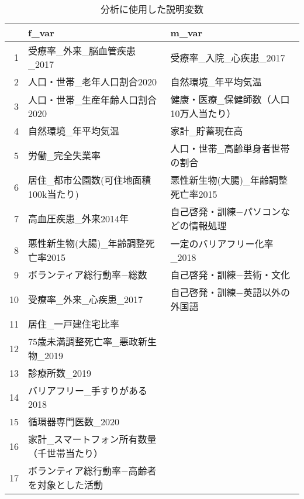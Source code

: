 \begin{table}[ht]
\centering
\begingroup\tiny
\begin{tabular}{rll}
  \hline
 & f\_var & m\_var \\
  \hline
1 & 受療率\_外来\_脳血管疾患\_2017 & 受療率\_入院\_心疾患\_2017 \\
  2 & 人口・世帯\_老年人口割合2020 & 自然環境\_年平均気温 \\
  3 & 人口・世帯\_生産年齢人口割合2020 & 健康・医療\_保健師数（人口10万人当たり） \\ 
  4 & 自然環境\_年平均気温 & 家計\_貯蓄現在高 \\
  5 & 労働\_完全失業率 & 人口・世帯\_高齢単身者世帯の割合 \\
  6 & 居住\_都市公園数(可住地面積100k当たり) & 悪性新生物(大腸)\_年齢調整死亡率2015 \\
  7 & 高血圧疾患\_外来2014年 & 自己啓発・訓練−パソコンなどの情報処理 \\
  8 & 悪性新生物(大腸)\_年齢調整死亡率2015 & 一定のバリアフリー化率\_2018 \\
  9 & ボランティア総行動率−総数 & 自己啓発・訓練−芸術・文化 \\
  10 & 受療率\_外来\_心疾患\_2017 & 自己啓発・訓練−英語以外の外国語 \\
  11 & 居住\_一戸建住宅比率 &  \\
  12 & 75歳未満調整死亡率\_悪政新生物\_2019 &  \\
  13 & 診療所数\_2019 &  \\
  14 & バリアフリー\_手すりがある2018 &  \\
  15 & 循環器専門医数\_2020 &  \\
  16 & 家計\_スマートフォン所有数量（千世帯当たり） &  \\
  17 & ボランティア総行動率−高齢者を対象とした活動 &  \\
   \hline
\end{tabular}
\endgroup
\caption{分析に使用した説明変数}
\label{tablelabel}
\end{table}
